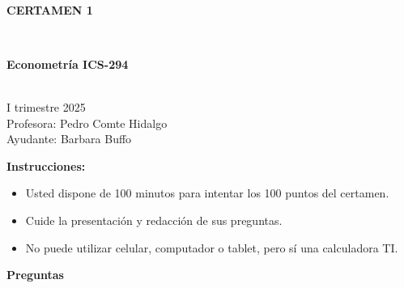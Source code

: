 \documentclass[10pt,a4paper]{article}
\begin{document}
\vspace{5cm}



\begin{center}
\begin{large}
\textbf{\\CERTAMEN 1}
\end{large}\\
\end{center}

\begin{center}
\begin{large}
\textbf{Econometría ICS-294}
\end{large}\\
\vspace{0.2cm}
I trimestre 2025\\
Profesora: Pedro Comte Hidalgo\\
Ayudante: Barbara Buffo
\end{center}

\textbf{Instrucciones:} 

\begin{itemize}

    \item Usted dispone de 100 minutos  para intentar los 100 puntos del certamen.
    \item Cuide la presentación y redacción de sus preguntas.
    \item No puede utilizar celular, computador o tablet, pero sí una calculadora TI.
     
\end{itemize}

\textbf{Preguntas}
\end{document}
